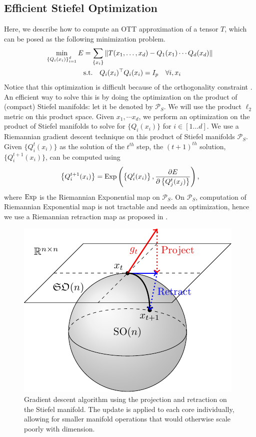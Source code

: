 \subsection{Efficient Stiefel Optimization}\label{sec:opt}
Here, we describe how to compute an OTT approximation of a tensor $T$, which can be posed as the following minimization problem.
\begin{align}
\min_{\left\{Q_i(x_i)\right\}_{i=1}^d} E &= \sum_{\left\{x_i\right\}} \|T(x_1,\ldots,x_d) - Q_1(x_1)\cdots Q_d(x_d)\| \notag \\ \quad & \mbox{s.t.} \quad Q_i(x_i)^\top Q_i(x_i) = I_p \quad \forall i, x_i
\end{align}
Notice that this optimization is difficult because of the orthogonality constraint \citep{edelman1998geometry,collins2014spectral}. An efficient way to solve this is by doing the optimization on the product of (compact) Stiefel manifolds: let it be denoted by $\mathcal{P}_S$. We will use the product $\ell_2$ metric on this product space. Given $x_1, \cdots x_d$, we perform
an optimization on the product of Stiefel manifolds to solve for $\{Q_i(x_i)\}$ for $i\in[1\ldots d]$. We use a Riemannian gradient descent technique on this product of Stiefel manifolds $\mathcal{P}_S$. Given $\{Q^t_i(x_i)\}$ as the solution of the $t^{th}$ step, the $(t+1)^{th}$ solution, $\{Q^{t+1}_i(x_i)\}$, can be computed using 
\begin{equation}
\left\{Q^{t+1}_i(x_i)\right\} = \operatorname*{Exp}\left(\left\{Q^{t}_i(x_i)\right\}, \frac{\partial E}{\partial \left\{Q^{t}_j(x_j)\right\}}\right),
\end{equation}
where $\operatorname*{Exp}$ is the Riemannian Exponential map on $\mathcal{P}_S$. On $\mathcal{P}_S$, computation of Riemannian Exponential map is not tractable and needs an optimization, hence we
use a Riemannian retraction map as proposed in \cite{6340355}.
\begin{figure}
	\centering
	\includegraphics[width=0.75\columnwidth,trim={0 1.5cm 0 0},clip]{4_ott/figs/stiefel/stiefel_update.pdf}
	\caption[Gradient descent on Stiefels]{\label{fig:ott_opt} Gradient descent algorithm using the projection and retraction on the Stiefel manifold. The update is applied to each core individually, allowing for smaller manifold operations that would otherwise scale poorly with dimension.}
\end{figure}


